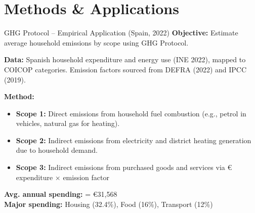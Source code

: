 \documentclass{beamer}
\begin{document}
\section{Methods \& Applications}

\begin{frame}{GHG Protocol – Empirical Application (Spain, 2022)}
\vspace{-2.5em}
  \footnotesize
\textbf{Objective:} Estimate average household emissions by scope using GHG Protocol.

\vspace{0.6em}
\textbf{Data:}  
Spanish household expenditure and energy use (INE 2022), mapped to COICOP categories. Emission factors sourced from DEFRA (2022) and IPCC (2019).

\vspace{0.6em}
\textbf{Method:}
\begin{itemize}
  \item \textbf{Scope 1:} Direct emissions from household fuel combustion (e.g., petrol in vehicles, natural gas for heating).
  \item \textbf{Scope 2:} Indirect emissions from electricity and district heating generation due to household demand.
  \item \textbf{Scope 3:} Indirect emissions from purchased goods and services via € expenditure × emission factor
\end{itemize}
\vspace{0.6em}
\textbf{Avg. annual spending:} = €31,568 \\ 
\textbf{Major spending:} Housing (32.4\%), Food (16\%), Transport (12\%)
\end{frame}
\end{document}
